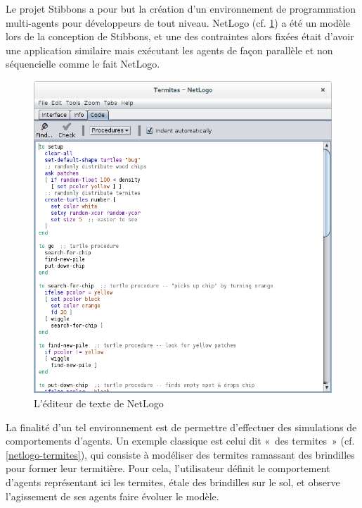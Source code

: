 
Le projet Stibbons a pour but la création d'un environnement de programmation multi-agents pour développeurs de tout niveau. NetLogo (cf. \ref{netlogo-code}) a été un modèle lors de la conception de Stibbons, et une des contraintes alors fixées était d'avoir une application similaire mais exécutant les agents de façon parallèle et non séquencielle comme le fait NetLogo.

\begin{figure}[h]
\centering
\includegraphics[scale=0.3]{doc/gestionProjet/netlogo-code.png}
\caption{\label{netlogo-code} L'éditeur de texte de NetLogo}
\end{figure}

La finalité d'un tel environnement est de permettre d'effectuer des simulations de comportements d'agents. Un exemple classique est celui dit «~des termites~» (cf. \ref{netlogo-termites}), qui consiste à modéliser des termites ramassant des brindilles pour former leur termitière.
Pour cela, l'utilisateur définit le comportement d'agents représentant ici les termites, étale des brindilles sur le sol, et observe l'agissement de ses agents faire évoluer le modèle.

